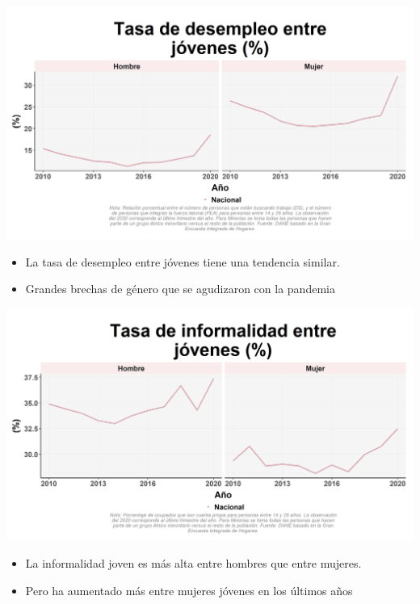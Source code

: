 \documentclass[aspectratio=169]{beamer}
\begin{document}
    \begin{slide}{14} 
            \begin{imagecolumn}
                \includegraphics[width=\columnwidth]{img/var_55_trend.png}
            \end{imagecolumn}
            \begin{textcolumn}
                \begin{itemize}
                    \item La tasa de desempleo entre jóvenes tiene una tendencia similar.
                    \item Grandes brechas de género que se agudizaron con la pandemia
                \end{itemize}
            \end{textcolumn}
    \printcolumns
    \end{slide}
    
    \begin{slide}{14} 
            \begin{imagecolumn}
                \includegraphics[width=\columnwidth]{img/var_75_trend.png}
            \end{imagecolumn}
            \begin{textcolumn}
                \begin{itemize}
                    \item La informalidad joven es más alta entre hombres que entre mujeres. 
                    \item Pero ha aumentado más entre mujeres jóvenes en los últimos años
                \end{itemize}
            \end{textcolumn}
    \printcolumns
    \end{slide}
    
\end{document}
